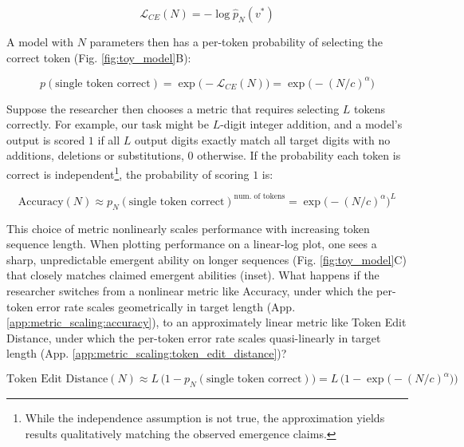 \begin{equation*}
    \mathcal{L}_{CE}(N) = - \log \hat{p}_N(v^*)
\end{equation*}

A model with $N$ parameters then has a per-token probability of selecting the correct token (Fig. \ref{fig:toy_model}B):

\begin{equation*}
    p(\text{single token correct}) = \exp \Big(- \mathcal{L}_{CE}(N) \Big) =\exp \Big(- (N/c)^{\alpha} \Big)
\end{equation*}

Suppose the researcher then chooses a metric that requires selecting $L$ tokens correctly.
For example, our task might be $L$-digit integer addition, and a model's output is scored $1$ if all $L$ output digits exactly match all target digits with no additions, deletions or substitutions, $0$ otherwise.
If the probability each token is correct is independent\footnote{While the independence assumption is not true, the approximation yields results qualitatively matching the observed emergence claims.}, the probability of scoring $1$ is:

\begin{equation*}
    \text{Accuracy}(N) \approx p_N(\text{single token correct})^{\text{num. of tokens}} = \exp \Big(- (N/c)^{\alpha} \Big)^L
\end{equation*}

This choice of metric nonlinearly scales performance with increasing token sequence length. When plotting performance on a linear-log plot, one sees a sharp, unpredictable emergent ability on longer sequences  (Fig. \ref{fig:toy_model}C) that closely matches claimed emergent abilities (inset).
What happens if the researcher switches from a nonlinear metric like Accuracy, under which the per-token error rate scales geometrically in target length (App. \ref{app:metric_scaling:accuracy}), to an approximately linear metric like Token Edit Distance, under which the per-token error rate scales quasi-linearly in target length (App. \ref{app:metric_scaling:token_edit_distance})?

\begin{equation*}
    \text{Token Edit Distance}(N) \approx L \, \Big(1 - p_N(\text{single token correct}) \Big) = L \, \Big( 1 - \exp \big(- (N/c)^{\alpha} \big) \Big)
\end{equation*}

